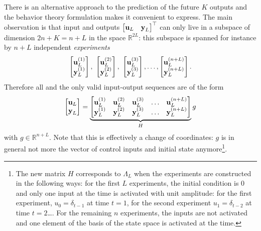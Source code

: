 There is an alternative approach to the prediction of the future $K$ outputs and the behavior theory formulation makes it convenient to express. The main observation is that input and outputs $
\begin{bmatrix}
  \boldsymbol{\mathrm{u}}_L& \boldsymbol{\mathrm{y}}_L
\end{bmatrix}^\top
$ can only live in a subspace of dimension $2n+K=n+L$ in the space $\mathbb{R}^{2L}$: this subspace is spanned for instance by $n+L$ independent \emph{experiments}
\begin{equation*}
  \begin{bmatrix}
    \boldsymbol{\mathrm{u}}_L^{(1)} \\ \boldsymbol{\mathrm{y}}_L^{(1)}
  \end{bmatrix},\
  \begin{bmatrix}
    \boldsymbol{\mathrm{u}}_L^{(2)} \\ \boldsymbol{\mathrm{y}}_L^{(2)}
  \end{bmatrix},\
  \begin{bmatrix}
    \boldsymbol{\mathrm{u}}_L^{(3)} \\ \boldsymbol{\mathrm{y}}_L^{(3)}
  \end{bmatrix},\ldots,
  \begin{bmatrix}
    \boldsymbol{\mathrm{u}}_L^{(n+L)} \\ \boldsymbol{\mathrm{y}}_L^{(n+L)}
  \end{bmatrix}.
\end{equation*}
Therefore all and the only valid input-output sequences are of the form
\begin{equation*}
  \begin{bmatrix}
    \boldsymbol{\mathrm{u}}_L \\ \boldsymbol{\mathrm{y}}_L
  \end{bmatrix} = \underbrace{
  \begin{bmatrix}
    \boldsymbol{\mathrm{u}}_L^{(1)} & \boldsymbol{\mathrm{u}}_L^{(2)} & \boldsymbol{\mathrm{u}}_L^{(3)} & \ldots & \boldsymbol{\mathrm{u}}_L^{(n+L)} \\
    \boldsymbol{\mathrm{y}}_L^{(1)} & \boldsymbol{\mathrm{y}}_L^{(2)} & \boldsymbol{\mathrm{y}}_L^{(3)} & \ldots & \boldsymbol{\mathrm{y}}_L^{(n+L)}
  \end{bmatrix}}_{H}g
\end{equation*}
with $g\in\mathbb{R}^{n+L}$. Note that this is effectively a change of coordinates: $g$ is in general not more the vector of control inputs and initial state anymore\footnote{The new matrix $H$ corresponds to $\Lambda_L$ when the experiments are constructed in the following ways: for the first $L$ experiments, the initial condition is 0 and only one input at the time is activated with unit amplitude: for the first experiment, $u_0=\delta_{t-1}$ at time $t=1$, for the second experiment $u_1=\delta_{t-2}$ at time $t=2$\ldots. For the remaining $n$ experiments, the inputs are not activated and one element of the basis of the state space is activated at the time.}.

